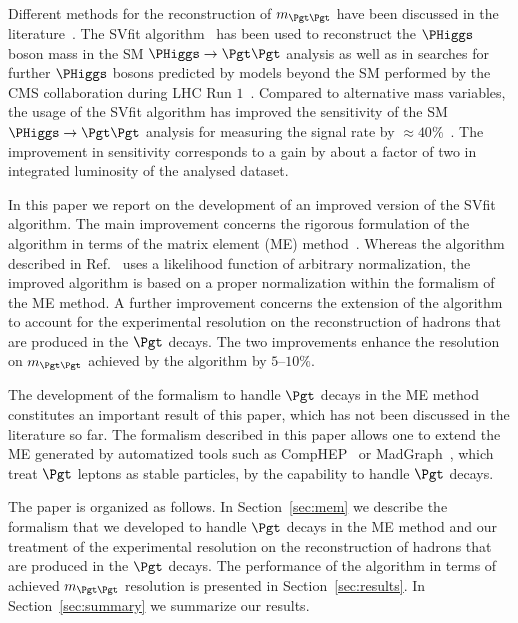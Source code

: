 Different methods for the reconstruction of $m_{\Pgt\Pgt}$ 
have been discussed in the literature~\cite{massRecoCollinearApprox,neutrinoRecByVertexInfo,MMC,Barr:2011he,Gripaios:2012th}. 
The SVfit algorithm~\cite{SVfit} has been used to reconstruct the $\PHiggs$ boson mass in the SM $\PHiggs \to \Pgt\Pgt$ analysis
as well as in searches for further $\PHiggs$ bosons predicted by models beyond the SM 
performed by the CMS collaboration during LHC Run $1$~\cite{HIG-10-002,HIG-11-029,HIG-13-004,HIG-13-021,HIG-14-029,HIG-14-033,HIG-15-001}.
Compared to alternative mass variables,
the usage of the SVfit algorithm has improved the sensitivity of the SM $\PHiggs \to \Pgt\Pgt$ analysis for measuring the signal rate by $\approx 40\%$~\cite{HIG-13-004}.
The improvement in sensitivity corresponds to a gain by about a factor of two in integrated luminosity of the analysed dataset.

In this paper we report on the development of an improved version of the SVfit algorithm.
The main improvement concerns the rigorous formulation of the algorithm in terms of the matrix element (ME) method~\cite{Kondo:1988yd,Kondo:1991dw}.
Whereas the algorithm described in Ref.~\cite{SVfit} uses a likelihood function of arbitrary normalization,
the improved algorithm is based on a proper normalization within the formalism of the ME method.
A further improvement concerns the extension of the algorithm to account for the experimental resolution 
on the reconstruction of hadrons that are produced in the $\Pgt$ decays.
The two improvements enhance the resolution on $m_{\Pgt\Pgt}$ achieved by the algorithm by $5$--$10\%$.

The development of the formalism to handle $\Pgt$ decays in the ME method constitutes an important result of this paper,
which has not been discussed in the literature so far.
The formalism described in this paper allows one to extend the ME generated by automatized tools such as CompHEP~\cite{CompHEP1,CompHEP2} or MadGraph~\cite{MadGraph},
which treat $\Pgt$ leptons as stable particles, by the capability to handle $\Pgt$ decays.

The paper is organized as follows. 
In Section~\ref{sec:mem} we describe the formalism that we developed to handle $\Pgt$ decays in the ME method
and our treatment of the experimental resolution on the reconstruction of hadrons that are produced in the $\Pgt$ decays.
The performance of the algorithm in terms of achieved $m_{\Pgt\Pgt}$ resolution is presented in Section~\ref{sec:results}.
In Section~\ref{sec:summary} we summarize our results.
